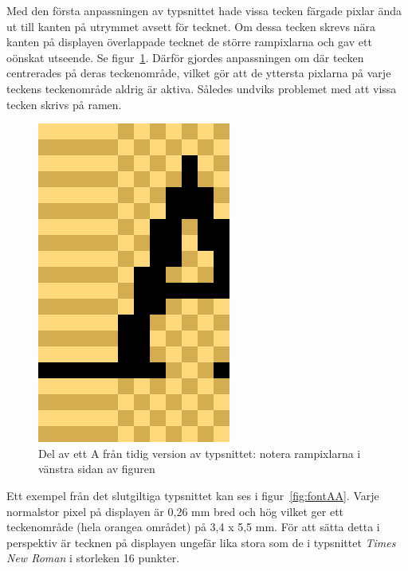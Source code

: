 \documentclass[a4paper,11pt]{article}
\begin{document}
Med den första anpassningen av typsnittet hade vissa tecken färgade pixlar ända ut till kanten på utrymmet avsett för tecknet. Om dessa tecken skrevs nära kanten på displayen överlappade tecknet de större rampixlarna och gav ett oönskat utseende. Se figur~\ref{fig:fontA}. Därför gjordes anpassningen om där tecken centrerades på deras teckenområde, vilket gör att de yttersta pixlarna på varje teckens teckenområde aldrig är aktiva. Således undviks problemet med att vissa tecken skrivs på ramen.\\

\begin{figure}[H]
\begin{center}
\includegraphics[scale=0.5, angle=0]{fontA.png}
\end{center}
\caption{Del av ett A från tidig version av typsnittet: notera rampixlarna i vänstra sidan av figuren}
\label{fig:fontA}
\end{figure}

Ett exempel från det slutgiltiga typsnittet kan ses i figur~\ref{fig:fontAA}. Varje normalstor pixel på displayen är 0,26 mm bred och hög vilket ger ett teckenområde (hela orangea området) på 3,4 x 5,5 mm. För att sätta detta i perspektiv är tecknen på displayen ungefär lika stora som de i typsnittet {\it Times New Roman} i storleken 16 punkter.\\
\end{document}
